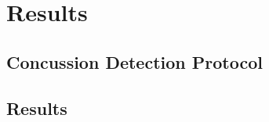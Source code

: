 \chapter{Results}
\label{chapter:results}


\section{Concussion Detection Protocol}



\section{Results}

